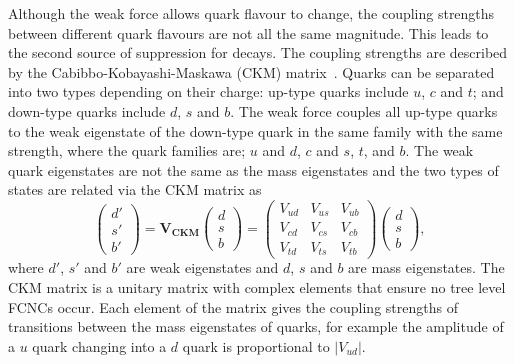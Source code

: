 Although the weak force allows quark flavour to change, the coupling strengths between different quark flavours are not all the same magnitude. This leads to the second source of suppression for \bmumu decays. The coupling strengths are described by the Cabibbo-Kobayashi-Maskawa (CKM) matrix~\cite{PhysRevLett.10.531,doi:10.1143/PTP.49.652}. Quarks can be separated into two types depending on their charge: up-type quarks include $u$, $c$ and $t$; and down-type quarks include $d$, $s$ and $b$. The weak force couples all up-type quarks to the weak eigenstate of the down-type quark in the same family with the same strength, where the quark families are; $u$ and $d$, $c$ and $s$, $t$, and $b$. The weak quark eigenstates are not the same as the mass eigenstates and the two types of states are related via the CKM matrix as
\begin{equation}
\begin{pmatrix}
d'\\
s'\\
b'
\end{pmatrix}
= 
\mathbf{V_{CKM}}
\begin{pmatrix}
d\\
s\\
b
\end{pmatrix} =
 \begin{pmatrix}
   V_{ud} & V_{us} & V_{ub} \\
   V_{cd} & V_{cs} & V_{cb} \\
   V_{td} & V_{ts} & V_{tb}
 \end{pmatrix}
\begin{pmatrix}
d\\
s\\
b
\end{pmatrix},
\label{eq:CKMA}
\end{equation}
where $d'$, $s'$ and $b'$ are weak eigenstates and $d$, $s$ and $b$ are mass eigenstates. The CKM matrix is a unitary matrix with complex elements that ensure no tree level FCNCs occur. Each element of the matrix gives the coupling strengths of transitions between the mass eigenstates of quarks, for example the amplitude of a $u$ quark changing into a $d$ quark is proportional to $|V_{ud}|$.

